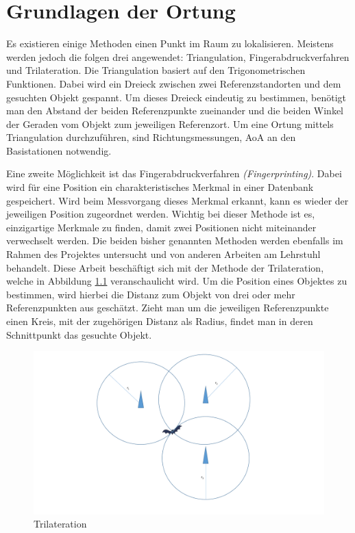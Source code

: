 \chapter{Grundlagen der Ortung}
\label{chap2:Grundlagen}

Es existieren einige Methoden einen Punkt im Raum zu lokalisieren. Meistens werden jedoch die folgen drei angewendet: Triangulation, Fingerabdruckverfahren und Trilateration. Die Triangulation basiert auf den Trigonometrischen Funktionen. Dabei wird ein Dreieck zwischen zwei Referenzstandorten und dem gesuchten Objekt gespannt. Um dieses Dreieck eindeutig zu bestimmen, benötigt man den Abstand der beiden Referenzpunkte zueinander und die beiden Winkel der Geraden vom Objekt zum jeweiligen Referenzort. Um eine Ortung mittels Triangulation durchzuführen, sind Richtungsmessungen, \gls{AoA} an den Basistationen notwendig.

Eine zweite Möglichkeit ist das Fingerabdruckverfahren \emph{(Fingerprinting)}. Dabei wird für eine Position ein charakteristisches Merkmal in einer Datenbank gespeichert. Wird beim Messvorgang dieses Merkmal erkannt, kann es wieder der jeweiligen Position zugeordnet werden. Wichtig bei dieser Methode ist es, einzigartige Merkmale zu finden, damit zwei Positionen nicht miteinander verwechselt werden. Die beiden bisher genannten Methoden werden ebenfalls im Rahmen des  Projektes  untersucht und von anderen Arbeiten am Lehrstuhl behandelt. 
Diese Arbeit beschäftigt sich mit der Methode der Trilateration, welche in Abbildung \ref{fig:Trilateration} veranschaulicht wird. Um die Position eines Objektes zu bestimmen, wird hierbei die Distanz zum Objekt von drei oder mehr Referenzpunkten aus geschätzt. Zieht man um die jeweiligen Referenzpunkte einen Kreis, mit der zugehörigen Distanz als Radius, findet man in deren Schnittpunkt das gesuchte Objekt.

\begin{figure}[htbp]
 \centering
 \includegraphics[width = \textwidth]{images/Trilateration}
 \caption{Trilateration}
 \label{fig:Trilateration}
\end{figure}

